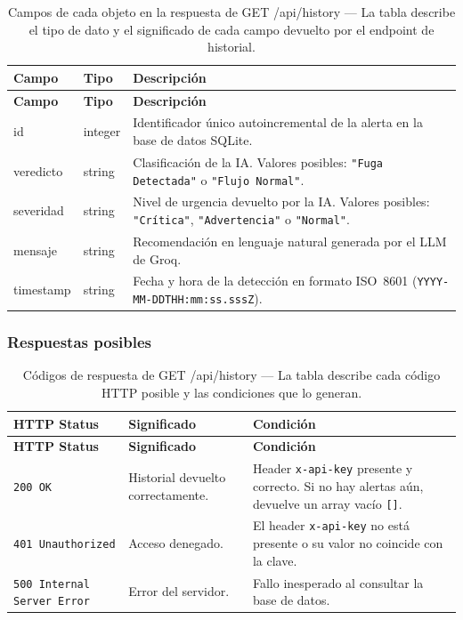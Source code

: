\documentclass[12pt,a4paper]{article}
\begin{document}
\begin{longtable}{>{\ttfamily}p{3cm} p{2.5cm} p{8cm}}
\caption{Campos de cada objeto en la respuesta de GET /api/history --- La tabla describe
  el tipo de dato y el significado de cada campo devuelto por el endpoint de historial.}
\label{tab:campos-history} \\
\toprule
\textbf{Campo} & \textbf{Tipo} & \textbf{Descripción} \\
\midrule
\endfirsthead
\toprule
\textbf{Campo} & \textbf{Tipo} & \textbf{Descripción} \\
\midrule
\endhead
\bottomrule
\endlastfoot
id & integer &
  Identificador único autoincremental de la alerta en la base de datos SQLite. \\[0.5em]
veredicto & string &
  Clasificación de la IA. Valores posibles: \texttt{"Fuga Detectada"} o
  \texttt{"Flujo Normal"}. \\[0.5em]
severidad & string &
  Nivel de urgencia devuelto por la IA. Valores posibles: \texttt{"Crítica"},
  \texttt{"Advertencia"} o \texttt{"Normal"}. \\[0.5em]
mensaje & string &
  Recomendación en lenguaje natural generada por el LLM de Groq. \\[0.5em]
timestamp & string &
  Fecha y hora de la detección en formato ISO~8601
  (\texttt{YYYY-MM-DDTHH:mm:ss.sssZ}). \\
\end{longtable}

\subsubsection{Respuestas posibles}

\begin{longtable}{p{2.5cm} p{4cm} p{7cm}}
\caption{Códigos de respuesta de GET /api/history --- La tabla describe cada código
  HTTP posible y las condiciones que lo generan.}
\label{tab:resp-get} \\
\toprule
\textbf{HTTP Status} & \textbf{Significado} & \textbf{Condición} \\
\midrule
\endfirsthead
\toprule
\textbf{HTTP Status} & \textbf{Significado} & \textbf{Condición} \\
\midrule
\endhead
\bottomrule
\endlastfoot
\texttt{200 OK} &
  Historial devuelto correctamente. &
  Header \texttt{x-api-key} presente y correcto. Si no hay alertas aún, devuelve
  un array vacío \texttt{[]}. \\[0.5em]
\texttt{401 Unauthorized} &
  Acceso denegado. &
  El header \texttt{x-api-key} no está presente o su valor no coincide con la clave. \\[0.5em]
\texttt{500 Internal Server Error} &
  Error del servidor. &
  Fallo inesperado al consultar la base de datos. \\
\end{longtable}
\end{document}
